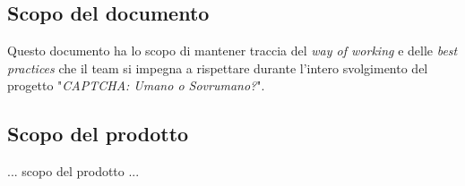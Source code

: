 \subsection{Scopo del documento}
Questo documento ha lo scopo di mantener traccia del \textit{way of working} e delle \textit{best practices} che il team si impegna a rispettare durante l'intero svolgimento del progetto "\textit{CAPTCHA: Umano o Sovrumano?}".

\subsection{Scopo del prodotto}
... scopo del prodotto ...

